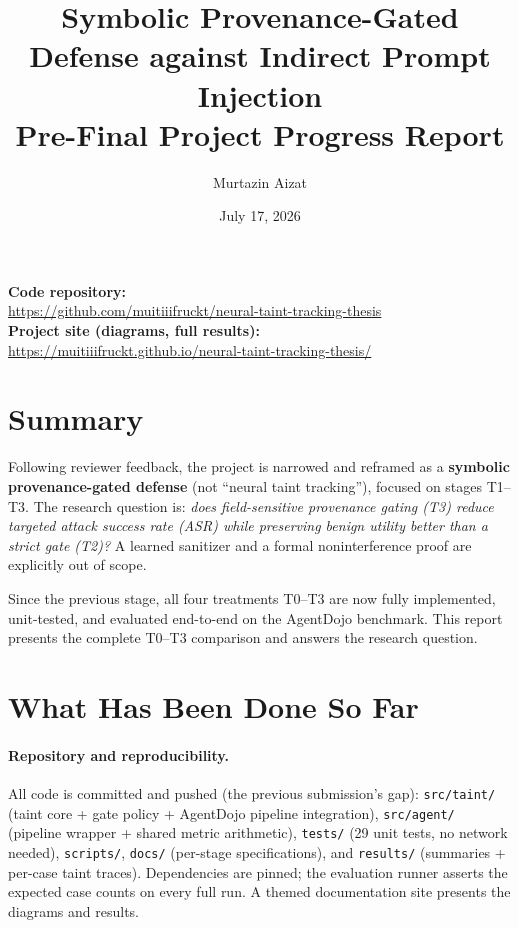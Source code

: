 \documentclass[11pt,a4paper]{article}
\title{Symbolic Provenance-Gated Defense against Indirect Prompt Injection\\[0.5em]\large Pre-Final Project Progress Report}
\author{Murtazin Aizat}
\date{July 17, 2026}
\begin{document}
\maketitle
\sloppy

\noindent\textbf{Code repository:}\\
\url{https://github.com/muitiiifruckt/neural-taint-tracking-thesis}\\[0.4em]
\textbf{Project site (diagrams, full results):}\\
\url{https://muitiiifruckt.github.io/neural-taint-tracking-thesis/}

\section*{Summary}

Following reviewer feedback, the project is narrowed and reframed as a \textbf{symbolic
provenance-gated defense} (not ``neural taint tracking''), focused on stages T1--T3. The
research question is: \emph{does field-sensitive provenance gating (T3) reduce targeted attack
success rate (ASR) while preserving benign utility better than a strict gate (T2)?} A learned
sanitizer and a formal noninterference proof are explicitly out of scope.

Since the previous stage, all four treatments T0--T3 are now fully implemented, unit-tested,
and evaluated end-to-end on the AgentDojo benchmark. This report presents the complete T0--T3
comparison and answers the research question.

\section{What Has Been Done So Far}

\paragraph{Repository and reproducibility.} All code is committed and pushed (the previous
submission's gap): \texttt{src/taint/} (taint core + gate policy + AgentDojo pipeline
integration), \texttt{src/agent/} (pipeline wrapper + shared metric arithmetic),
\texttt{tests/} (29 unit tests, no network needed), \texttt{scripts/}, \texttt{docs/}
(per-stage specifications), and \texttt{results/} (summaries + per-case taint traces).
Dependencies are pinned; the evaluation runner asserts the expected case counts on every full
run. A themed documentation site presents the diagrams and results.
\end{document}
